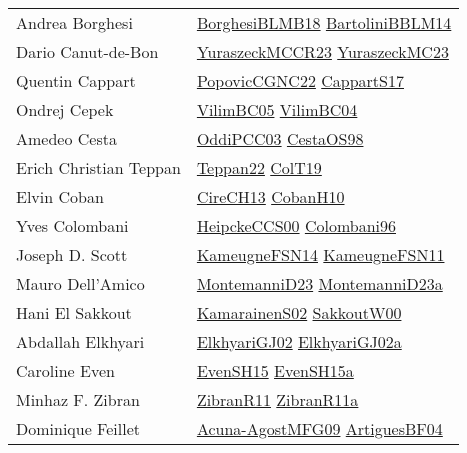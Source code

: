 {\begin{longtable}{p{4cm}p{20cm}}
Andrea Borghesi & \href{articles/BorghesiBLMB18.pdf}{BorghesiBLMB18}\cite{BorghesiBLMB18} \href{papers/BartoliniBBLM14.pdf}{BartoliniBBLM14}\cite{BartoliniBBLM14} \\
Dario Canut{-}de{-}Bon & \href{articles/YuraszeckMCCR23.pdf}{YuraszeckMCCR23}\cite{YuraszeckMCCR23} \href{papers/YuraszeckMC23.pdf}{YuraszeckMC23}\cite{YuraszeckMC23} \\
Quentin Cappart & \href{papers/PopovicCGNC22.pdf}{PopovicCGNC22}\cite{PopovicCGNC22} \href{papers/CappartS17.pdf}{CappartS17}\cite{CappartS17} \\
Ondrej Cepek & \href{articles/VilimBC05.pdf}{VilimBC05}\cite{VilimBC05} \href{papers/VilimBC04.pdf}{VilimBC04}\cite{VilimBC04} \\
Amedeo Cesta & \href{papers/OddiPCC03.pdf}{OddiPCC03}\cite{OddiPCC03} \href{papers/CestaOS98.pdf}{CestaOS98}\cite{CestaOS98} \\
Erich Christian Teppan & \href{papers/Teppan22.pdf}{Teppan22}\cite{Teppan22} \href{papers/ColT19.pdf}{ColT19}\cite{ColT19} \\
Elvin Coban & \href{papers/CireCH13.pdf}{CireCH13}\cite{CireCH13} \href{papers/CobanH10.pdf}{CobanH10}\cite{CobanH10} \\
Yves Colombani & \href{articles/HeipckeCCS00.pdf}{HeipckeCCS00}\cite{HeipckeCCS00} \href{papers/Colombani96.pdf}{Colombani96}\cite{Colombani96} \\
Joseph D. Scott & \href{articles/KameugneFSN14.pdf}{KameugneFSN14}\cite{KameugneFSN14} \href{papers/KameugneFSN11.pdf}{KameugneFSN11}\cite{KameugneFSN11} \\
Mauro Dell'Amico & \href{articles/MontemanniD23.pdf}{MontemanniD23}\cite{MontemanniD23} \href{articles/MontemanniD23a.pdf}{MontemanniD23a}\cite{MontemanniD23a} \\
Hani El Sakkout & \href{papers/KamarainenS02.pdf}{KamarainenS02}\cite{KamarainenS02} \href{articles/SakkoutW00.pdf}{SakkoutW00}\cite{SakkoutW00} \\
Abdallah Elkhyari & \href{papers/ElkhyariGJ02.pdf}{ElkhyariGJ02}\cite{ElkhyariGJ02} \href{papers/ElkhyariGJ02a.pdf}{ElkhyariGJ02a}\cite{ElkhyariGJ02a} \\
Caroline Even & \href{papers/EvenSH15.pdf}{EvenSH15}\cite{EvenSH15} \href{articles/EvenSH15a.pdf}{EvenSH15a}\cite{EvenSH15a} \\
Minhaz F. Zibran & \href{papers/ZibranR11.pdf}{ZibranR11}\cite{ZibranR11} \href{papers/ZibranR11a.pdf}{ZibranR11a}\cite{ZibranR11a} \\
Dominique Feillet & \href{papers/Acuna-AgostMFG09.pdf}{Acuna-AgostMFG09}\cite{Acuna-AgostMFG09} \href{papers/ArtiguesBF04.pdf}{ArtiguesBF04}\cite{ArtiguesBF04} \\

\end{longtable}}
